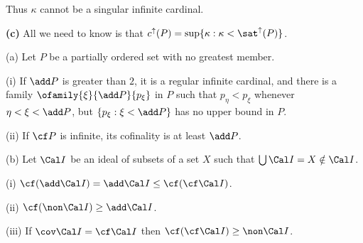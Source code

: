 {Thus $\kappa$ cannot be a singular infinite cardinal.

\medskip

{\bf (c)} All we need to know is that
$c^{\uparrow}(P)=\sup\{\kappa:\kappa<\sat^{\uparrow}(P)\}$.
}%


 (a) Let $P$ be a partially ordered set with
no greatest member.

\quad(i) If $\add P$ is greater than $2$, it is a regular infinite cardinal, and there is a
family $\ofamily{\xi}{\add P}{p_{\xi}}$ in $P$ such that
$p_{\eta}<p_{\xi}$ whenever $\eta<\xi<\add P$, but
$\{p_{\xi}:\xi<\add P\}$ has no upper bound in $P$.

\quad(ii) If $\cf P$ is infinite, its cofinality is at least $\add P$.

(b) Let $\Cal I$ be an ideal of subsets of a set $X$ such that
$\bigcup\Cal I=X\notin\Cal I$.

\quad(i) $\cf(\add\Cal I)=\add\Cal I\le\cf(\cf\Cal I)$.

\quad(ii) $\cf(\non\Cal I)\ge\add\Cal I$.

\quad(iii) If $\cov\Cal I=\cf\Cal I$ then $\cf(\cf\Cal I)\ge\non\Cal I$.

